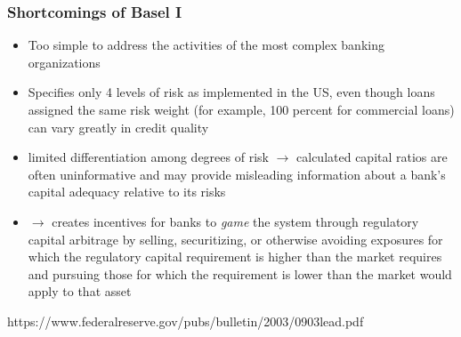 \documentclass[11pt]{beamer}
\begin{document}
\begin{frame}
\frametitle{Shortcomings of Basel I}
\begin{itemize}
\item Too simple to address the activities of the most complex
banking organizations
\item  Specifies only 4 levels of risk as implemented in the US, even though loans assigned the same risk weight (for example, 100 percent for commercial loans) can vary greatly in credit quality
\item limited differentiation among degrees of risk $\rightarrow$ calculated capital ratios are often uninformative and may provide misleading information about a bank's capital adequacy relative to its risks
\item $\rightarrow$ creates incentives for banks to \textit{game} the system through regulatory capital arbitrage by selling, securitizing, or otherwise avoiding exposures for which the regulatory capital requirement is higher than the market requires and pursuing those for which the requirement is lower than the market would apply to that asset

\end{itemize}
\tiny{https://www.federalreserve.gov/pubs/bulletin/2003/0903lead.pdf}

\end{frame}
\end{document}
